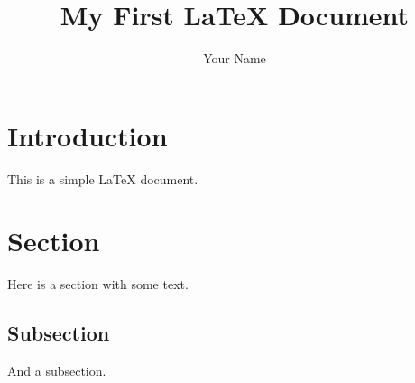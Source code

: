 \documentclass{article}
\title{My First LaTeX Document}
\author{Your Name}
\begin{document}
\maketitle

\section{Introduction}
This is a simple LaTeX document.

\section{Section}
Here is a section with some text.

\subsection{Subsection}
And a subsection.
\end{document}
